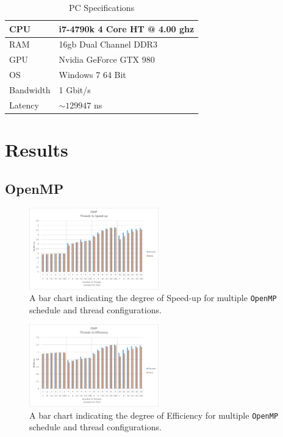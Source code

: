 \documentclass[journal,transmag]{IEEEtran}
\begin{document}
	\begin{table}[]
		\centering
		\caption{PC Specifications}
		\label{pcSpecsTable}
		\begin{tabular}{|l|l|}
			\hline
			CPU & i7-4790k 4 Core HT @ 4.00 ghz \\ \hline
			RAM & 16gb Dual Channel DDR3        \\ \hline
			GPU & Nvidia GeForce GTX 980        \\ \hline
			OS  & Windows 7 64 Bit              \\ \hline
			Bandwidth & 1 Gbit/s  				\\ \hline
			Latency   & $\sim129947$ ns 		\\ \hline
		\end{tabular}
	\end{table}
		
\newpage


\section{Results}
	\subsection{OpenMP}
		\begin{figure}[h]
			\centering
			\includegraphics[width = 0.5\textwidth]{chartOMPSpeed}
			\caption{A bar chart indicating the degree of Speed-up for multiple \texttt{OpenMP} schedule and thread configurations.}
			\label{fig_omp_speed}
		\end{figure}
		
		\begin{figure}[h]
			\centering
			\includegraphics[width = 0.5\textwidth]{chartOMPEff}
			\caption{A bar chart indicating the degree of Efficiency for multiple \texttt{OpenMP} schedule and thread configurations.}
			\label{fig_omp_eff}
		\end{figure}
		\newpage
\end{document}
